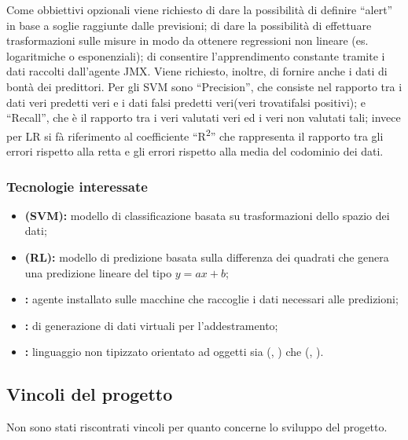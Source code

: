 			Come obbiettivi opzionali viene richiesto di dare la possibilità di definire ``alert'' in base a soglie raggiunte dalle previsioni; di dare la possibilità di effettuare trasformazioni sulle misure in modo da ottenere regressioni non lineare (es. logaritmiche o esponenziali); di consentire l'apprendimento constante tramite i dati raccolti dall'agente JMX. Viene richiesto, inoltre, di fornire anche i dati di bontà dei predittori. Per gli SVM sono ``Precision'', che consiste nel rapporto tra i dati veri predetti veri e i dati falsi predetti veri(veri trovati\/falsi positivi); e ``Recall'', che è il rapporto tra i veri valutati veri ed i veri non valutati tali; invece per LR si fà riferimento al coefficiente ``R\textsuperscript{2}'' che rappresenta il rapporto tra gli errori rispetto alla retta e gli errori rispetto alla media del codominio dei dati.


		\subsubsection{Tecnologie interessate}
			\begin{itemize}
			  \item \textbf{ (SVM):} modello di classificazione basata su trasformazioni dello spazio dei dati;
			  \item \textbf{ (RL):} modello di predizione basata sulla differenza dei quadrati che genera una predizione lineare del tipo \(y=ax+b\);
				\item \textbf{:} agente installato sulle macchine che raccoglie i dati necessari alle predizioni;
				\item \textbf{:}  di generazione di dati virtuali per l'addestramento;
			  \item \textbf{:} linguaggio non tipizzato orientato ad oggetti sia  (, ) che  (, ).
			\end{itemize}

		\subsection{Vincoli del progetto}
			Non sono stati riscontrati vincoli per quanto concerne lo sviluppo del progetto.

